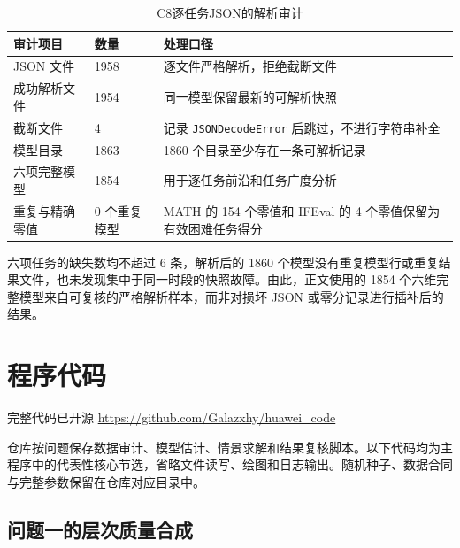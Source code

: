 \documentclass[bwprint]{gmcmthesis}
\newcommand{\TableSetup}{%
    \centering
    \normalsize
    \setlength{\tabcolsep}{5pt}%
    \renewcommand{\arraystretch}{1.13}%
}
\begin{document}
\begin{appendices}
    \begin{table}[H]
        \caption{C8逐任务JSON的解析审计}
        \label{tab:appendix-c8-audit}
        \TableSetup
        \begin{tabular}{P{4.2cm} C{2.4cm} C{7.0cm}}
            \toprule
            审计项目    & 数量      & 处理口径                                      \\
            \midrule
            JSON 文件 & 1958    & 逐文件严格解析，拒绝截断文件                            \\
            成功解析文件  & 1954    & 同一模型保留最新的可解析快照                            \\
            截断文件    & 4       & 记录 \texttt{JSONDecodeError} 后跳过，不进行字符串补全  \\
            模型目录    & 1863    & 1860 个目录至少存在一条可解析记录                       \\
            六项完整模型  & 1854    & 用于逐任务前沿和任务广度分析                            \\
            重复与精确零值 & 0 个重复模型 & MATH 的 154 个零值和 IFEval 的 4 个零值保留为有效困难任务得分 \\
            \bottomrule
        \end{tabular}
    \end{table}

    六项任务的缺失数均不超过 6 条，解析后的 1860 个模型没有重复模型行或重复结果文件，也未发现集中于同一时段的快照故障。由此，正文使用的 1854 个六维完整模型来自可复核的严格解析样本，而非对损坏 JSON 或零分记录进行插补后的结果。

    \clearpage
    \section{程序代码}

    \begin{center}
        \small 完整代码已开源\quad
        \url{https://github.com/Galazxhy/huawei_code}
    \end{center}

    仓库按问题保存数据审计、模型估计、情景求解和结果复核脚本。以下代码均为主程序中的代表性核心节选，省略文件读写、绘图和日志输出。随机种子、数据合同与完整参数保留在仓库对应目录中。

    \subsection{问题一的层次质量合成}


\end{appendices}
\end{document}
